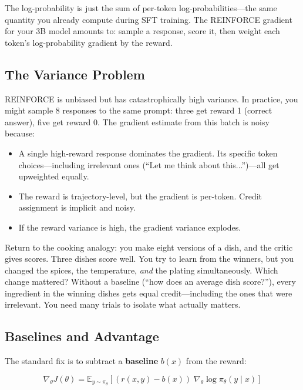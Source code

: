 The log-probability is just the sum of per-token log-probabilities---the same quantity you already compute during SFT training. The REINFORCE gradient for your 3B model amounts to: sample a response, score it, then weight each token's log-probability gradient by the reward.

\subsection{The Variance Problem}

REINFORCE is unbiased but has catastrophically high variance. In practice, you might sample 8 responses to the same prompt: three get reward 1 (correct answer), five get reward 0. The gradient estimate from this batch is noisy because:

\begin{itemize}[nosep]
  \item A single high-reward response dominates the gradient. Its specific token choices---including irrelevant ones (``Let me think about this...'')---all get upweighted equally.
  \item The reward is trajectory-level, but the gradient is per-token. Credit assignment is implicit and noisy.
  \item If the reward variance is high, the gradient variance explodes.
\end{itemize}

Return to the cooking analogy: you make eight versions of a dish, and the critic gives scores. Three dishes score well. You try to learn from the winners, but you changed the spices, the temperature, \emph{and} the plating simultaneously. Which change mattered? Without a baseline (``how does an average dish score?''), every ingredient in the winning dishes gets equal credit---including the ones that were irrelevant. You need many trials to isolate what actually matters.

\subsection{Baselines and Advantage}

The standard fix is to subtract a \textbf{baseline} $b(x)$ from the reward:

\begin{equation}
\label{eq:reinforce-baseline}
\nabla_\theta J(\theta) = \mathbb{E}_{y \sim \pi_\theta}\!\left[(r(x, y) - b(x)) \; \nabla_\theta \log \pi_\theta(y \mid x)\right]
\end{equation}


